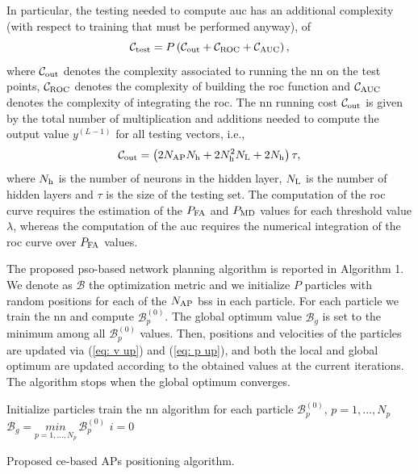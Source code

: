 \documentclass[conference,draftcls,onecolumn]{IEEEtran}
\begin{document}
In particular, the testing needed to compute \ac{auc} has an additional complexity (with respect to training that must be performed anyway), of 
\begin{equation}
    \mathcal{C}_{\rm test} = P \left( \mathcal{C}_{\rm out}+\mathcal{C}_{\rm ROC}+\mathcal{C}_{\rm AUC}\right),
\end{equation}
where  $\mathcal{C}_{\rm out}$ denotes the complexity associated to running the \ac{nn} on the test points, $\mathcal{C}_{\rm ROC}$ denotes the complexity of building the \ac{roc} function and $\mathcal{C}_{\rm AUC}$ denotes the complexity of integrating the \ac{roc}. The \ac{nn} running cost $\mathcal{C}_{\rm out}$ is given by the total number of multiplication and additions needed to compute the output value $y^{(L-1)}$ for all testing vectors, i.e.,
\begin{equation}
    \mathcal{C}_{\rm out} = \left(2N_{\rm AP}N_{\rm h}+2N_{\rm h}^2N_{\rm L} + 2N_{\rm h}\right)\tau ,
\end{equation}
where $N_{\rm h}$ is the number of neurons in the hidden layer, $N_{\rm L}$ is the number of hidden layers and $\tau$ is the size of the testing set.
The computation of the \ac{roc} curve requires the estimation of the $P_{\rm FA}$ and $P_{\rm MD}$ values for each threshold value $\lambda$, whereas the computation of the \ac{auc} requires the numerical integration of the \ac{roc} curve over $P_{\rm FA}$ values.

The proposed \ac{pso}-based network planning algorithm is reported in Algorithm 1. We denote as $\mathcal{B}$ the optimization metric and we initialize $P$ particles with random positions for each of the $N_{\rm AP}$ \acp{bs} in each particle. For each particle we train the \ac{nn} and compute $\mathcal{B}_p^{(0)}$. The global optimum value $\mathcal{B}_g$ is set to the minimum among all $\mathcal{B}_p^{(0)}$ values. Then, positions and velocities of the particles are updated via (\ref{eq: v up}) and (\ref{eq: p up}), and both the local and global optimum are updated according to the obtained values at the current iterations. The algorithm stops when the global optimum converges.

 \begin{algorithm}[b!]

\small

  Initialize particles\;
  train the \ac{nn} algorithm for each particle\;
  $\mathcal{B}_p^{(0)}$, $p=1,...,N_p$\;
  $\mathcal{B}_g=\underset{p=1,...,N_p}{min} \, \mathcal{B}_p^{(0)}$\;
  $i = 0$\;

      
\caption{Proposed \ac{ce}-based APs positioning algorithm.}
 \end{algorithm}      
\end{document}
